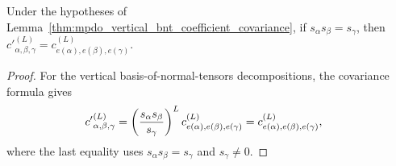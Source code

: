 \begin{lemma}%
    \label{thm:mpdo_vertical_bnt_coefficient_transport_exact}
    \leanok
    Under the hypotheses of
    Lemma~\ref{thm:mpdo_vertical_bnt_coefficient_covariance}, if
    $s_\alpha s_\beta=s_\gamma$, then
    ${c'}^{(L)}_{\alpha,\beta,\gamma}
        =c^{(L)}_{e(\alpha),e(\beta),e(\gamma)}$.
\end{lemma}
\begin{proof}\leanok
    For the vertical basis-of-normal-tensors decompositions, the covariance formula gives
    \begin{align}
        {c'}^{(L)}_{\alpha,\beta,\gamma}
         & =\left(\frac{s_\alpha s_\beta}{s_\gamma}\right)^L
        c^{(L)}_{e(\alpha),e(\beta),e(\gamma)}
        =c^{(L)}_{e(\alpha),e(\beta),e(\gamma)},
        \notag
    \end{align}
    where the last equality uses $s_\alpha s_\beta=s_\gamma$ and
    $s_\gamma\ne0$.
\end{proof}

